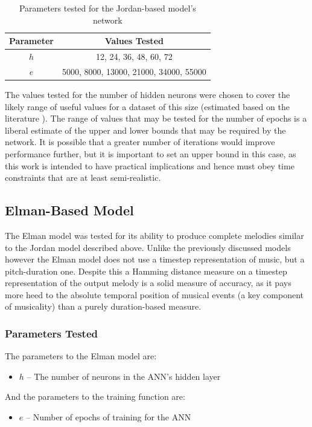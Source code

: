 \documentclass[ author={Stephen Livermore-Tozer},
				supervisor={Dr. Peter Flach},
				degree={MEng},
				title={Algorithmic Co-composition Using Machine Learning},
				subtitle={},
				type={research},
				year={2016} ]{dissertation}
\begin{document}
	\begin{table}[h]
		\begin{center}
			\begin{tabular}{cc}
				\toprule
				Parameter & Values Tested\\
				\hline
				$h$ & 12, 24, 36, 48, 60, 72\\
				$e$ & 5000, 8000, 13000, 21000, 34000, 55000\\
				\bottomrule
			\end{tabular}
		\end{center}
		\caption{Parameters tested for the Jordan-based model's network}
		\label{tab:jordan-net-parameters}
	\end{table}
	
	The values tested for the number of hidden neurons were chosen to cover the likely range of useful values for a dataset of this size (estimated based on the literature \cite{todd1989connectionist}). The range of values that may be tested for the number of epochs is a liberal estimate of the upper and lower bounds that may be required by the network. It is possible that a greater number of iterations would improve performance further, but it is important to set an upper bound in this case, as this work is intended to have practical implications and hence must obey time constraints that are at least semi-realistic.
	
	\subsection{Elman-Based Model}
	
	The Elman model was tested for its ability to produce complete melodies similar to the Jordan model described above. Unlike the previously discussed models however the Elman model does not use a timestep representation of music, but a pitch-duration one. Despite this a Hamming distance measure on a timestep representation of the output melody is a solid measure of accuracy, as it pays more heed to the absolute temporal position of musical events (a key component of musicality) than a purely duration-based measure.
	
	\subsubsection{Parameters Tested}
	
	The parameters to the Elman model are:
	\begin{itemize}
		\item $h$ -- The number of neurons in the ANN's hidden layer
	\end{itemize}
	And the parameters to the training function are:
	\begin{itemize}
		\item $e$ -- Number of epochs of training for the ANN
	\end{itemize}
	
\end{document}
